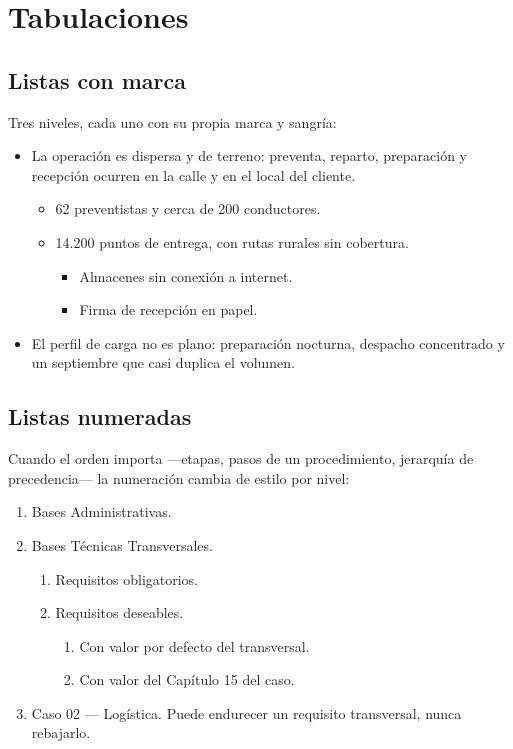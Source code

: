 \documentclass[carta,firma,borrador]{lafrox}
\begin{document}
\section{Tabulaciones}

\subsection{Listas con marca}

Tres niveles, cada uno con su propia marca y sangría:

\begin{itemize}
  \item La operación es dispersa y de terreno: preventa, reparto, preparación
        y recepción ocurren en la calle y en el local del cliente.
        \begin{itemize}
          \item 62 preventistas y cerca de 200 conductores.
          \item 14.200 puntos de entrega, con rutas rurales sin cobertura.
            \begin{itemize}
              \item Almacenes sin conexión a internet.
              \item Firma de recepción en papel.
            \end{itemize}
        \end{itemize}
  \item El perfil de carga no es plano: preparación nocturna, despacho
        concentrado y un septiembre que casi duplica el volumen.
\end{itemize}

\subsection{Listas numeradas}

Cuando el orden importa —etapas, pasos de un procedimiento, jerarquía de
precedencia— la numeración cambia de estilo por nivel:

\begin{enumerate}
  \item Bases Administrativas.
  \item Bases Técnicas Transversales.
    \begin{enumerate}
      \item Requisitos obligatorios.
      \item Requisitos deseables.
        \begin{enumerate}
          \item Con valor por defecto del transversal.
          \item Con valor del Capítulo 15 del caso.
        \end{enumerate}
    \end{enumerate}
  \item Caso 02 --- Logística. Puede endurecer un requisito transversal, nunca
        rebajarlo.
\end{enumerate}
\end{document}
